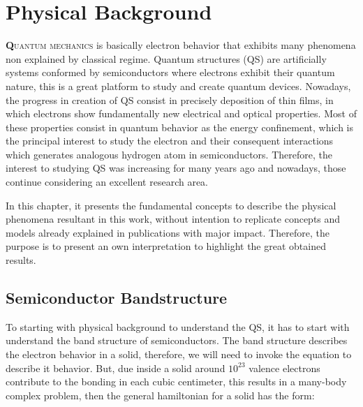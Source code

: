\chapter{Physical Background }
\label{This chapter bears the basis of fundamental physics in semiconductors and
quantum structures that were implemented to understand the results in this work..}
\vfill
\minitoc
\newpage

\lettrine[lines=3, lraise=.1, nindent=0mm, slope=0mm]{\textbf{Q}}{uantum mechanics}  is basically electron behavior that exhibits many phenomena non explained by classical regime. Quantum structures (QS) are artificially systems conformed by semiconductors where electrons exhibit their quantum nature, this is a great platform to study and create quantum devices. Nowadays, the progress in creation of QS consist in precisely deposition of thin films, in which electrons show fundamentally new electrical and optical properties\cite{sundram1991structures}. Most of these properties consist in quantum behavior  as the energy confinement, which is the principal interest to study the electron and their consequent interactions which generates analogous  hydrogen atom in semiconductors. Therefore, the interest to studying QS was increasing for many years ago and nowadays, those continue considering an excellent research area.  

In this chapter, it presents the fundamental concepts to describe the physical  phenomena resultant in this work, without intention to replicate concepts and models already explained in publications with major impact. Therefore, the purpose is to present an own interpretation to highlight the great obtained results.

\section{Semiconductor Bandstructure}
\label{sec:chapter-1-semiconductor}
\vspace{-10mm}
To starting with physical background to understand the QS, it has to start with understand the  band structure of semiconductors. The band structure describes the electron behavior in a solid, therefore, we will need to invoke the \sch equation to describe it behavior. But, due inside a solid around $10^{23}$ valence electrons contribute to the bonding in each cubic centimeter, this results in a many-body complex problem\cite{piprek2017handbook}, then the general hamiltonian for a solid has the form\cite{alloul2010introduction,cardona2005fundamentals}: 

